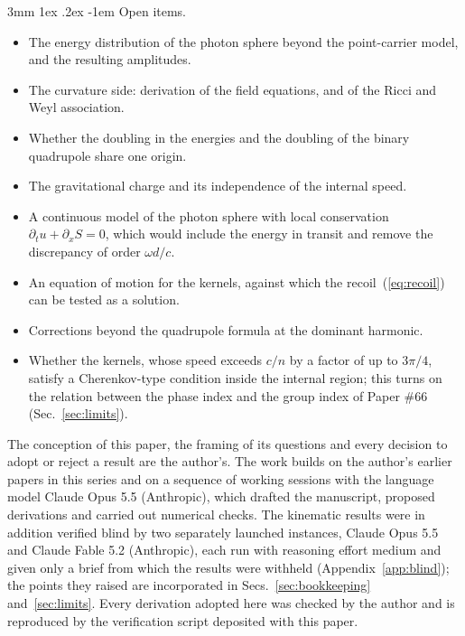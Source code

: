 \documentclass[%
 reprint, amsmath,amssymb, aps, prb, ]{revtex4-2}
\makeatletter
\numberwithin{equation}{section}
\renewcommand\paragraph{%
  \@startsection{paragraph}{4}{\z@}%
    {3mm \@plus 1ex \@minus .2ex}%
    {-1em}%
    {\normalfont\normalsize\itshape}}
\makeatother
\begin{document}
\paragraph{Open items.}
\begin{itemize}[leftmargin=2.4em]
\item[O1.] The energy distribution of the photon sphere beyond the point-carrier model, and the resulting amplitudes.
\item[O2.] The curvature side: derivation of the field equations, and of the Ricci and Weyl association.
\item[O3.] Whether the doubling in the energies and the doubling of the binary quadrupole share one origin.
\item[O4.] The gravitational charge and its independence of the internal speed.
\item[O5.] A continuous model of the photon sphere with local conservation $\partial_tu + \partial_xS = 0$, which would include the energy in transit and remove the discrepancy of order $\omega d/c$.
\item[O6.] An equation of motion for the kernels, against which the recoil~(\ref{eq:recoil}) can be tested as a solution.
\item[O7.] Corrections beyond the quadrupole formula at the dominant harmonic.
\item[O8.] Whether the kernels, whose speed exceeds $c/n$ by a factor of up to $3\pi/4$, satisfy a Cherenkov-type condition inside the internal region; this turns on the relation between the phase index and the group index of Paper \#66 (Sec.~\ref{sec:limits}).
\end{itemize}

\begin{acknowledgments}
The conception of this paper, the framing of its questions and every decision to adopt or reject a result are the author's. The work builds on the author's earlier papers in this series and on a sequence of working sessions with the language model Claude Opus 5.5 (Anthropic), which drafted the manuscript, proposed derivations and carried out numerical checks. The kinematic results were in addition verified blind by two separately launched instances, Claude Opus 5.5 and Claude Fable 5.2 (Anthropic), each run with reasoning effort medium and given only a brief from which the results were withheld (Appendix~\ref{app:blind}); the points they raised are incorporated in Secs.~\ref{sec:bookkeeping} and~\ref{sec:limits}. Every derivation adopted here was checked by the author and is reproduced by the verification script deposited with this paper.
\end{acknowledgments}
\end{document}

